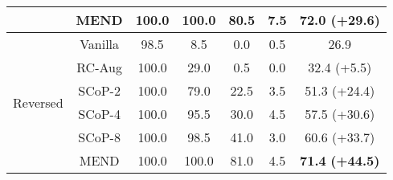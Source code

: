 \begin{table}[t]
{\begin{tabular}{ccccccc}
          & MEND  & 100.0  & 100.0  & 80.5  & 7.5   & \textbf{72.0} \textcolor{my_green}{\textbf{(+29.6)}} \\
    \midrule
    \multirow{6}[2]{*}{\begin{sideways}Reversed\end{sideways}} & Vanilla & 98.5  & 8.5   & 0.0   & 0.5   & 26.9  \\
          & RC-Aug & 100.0  & 29.0  & 0.5   & 0.0   & 32.4 \textcolor{my_green}{(+5.5)} \\
          & SCoP-2 & 100.0  & 79.0  & 22.5  & 3.5   & 51.3 \textcolor{my_green}{(+24.4)} \\
          & SCoP-4 & 100.0  & 95.5  & 30.0  & 4.5   & 57.5 \textcolor{my_green}{(+30.6)} \\
          & SCoP-8 & 100.0  & 98.5  & 41.0  & 3.0   & 60.6 \textcolor{my_green}{(+33.7)} \\
          & MEND  & 100.0  & 100.0  & 81.0  & 4.5   & \textbf{71.4} \textcolor{my_green}{\textbf{(+44.5)}} \\
    \bottomrule
    \end{tabular}%
    }
  \label{tab:appendix-permutation}%
\end{table}%